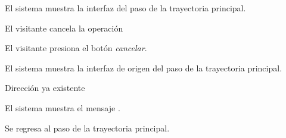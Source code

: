 {\begin{trayectoriaPrincipal}
    \item El sistema muestra la interfaz del paso 
      de la trayectoria principal.

  \end{trayectoriaPrincipal}


  \begin{trayectoriaAlternativa}
    {El visitante cancela la operación}

    \item El visitante presiona el botón \textit{cancelar}.

    \item El sistema muestra la interfaz de origen del paso
       de la trayectoria principal.

  \end{trayectoriaAlternativa}


  \begin{trayectoriaAlternativa}
    {Dirección ya existente}

    \item El sistema muestra el mensaje
      .

    \item Se regresa al paso  de la trayectoria
      principal.

  \end{trayectoriaAlternativa}
}
